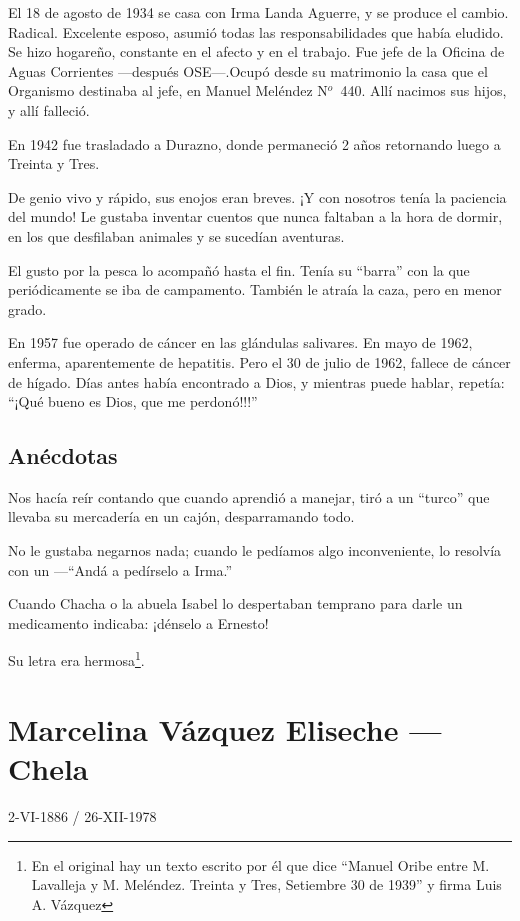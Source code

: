 \documentclass[a4paper]{article}
\begin{document}
El 18 de agosto de 1934 se casa con Irma Landa Aguerre, y se produce el cambio. Radical. Excelente esposo, asumió todas las responsabilidades que había eludido. Se hizo hogareño, constante en el afecto y en el trabajo. Fue jefe de la Oficina de Aguas Corrientes ---después OSE---.\@ Ocupó desde su matrimonio la casa que el Organismo destinaba al jefe, en Manuel Meléndez N$^o$~440. Allí nacimos sus hijos, y allí falleció.

En 1942 fue trasladado a Durazno, donde permaneció 2 años retornando luego a Treinta y Tres.

De genio vivo y rápido, sus enojos eran breves. ¡Y con nosotros tenía la paciencia del mundo! Le gustaba inventar cuentos que nunca faltaban a la hora de dormir, en los que desfilaban animales y se sucedían aventuras.

El gusto por la pesca lo acompañó hasta el fin. Tenía su ``barra'' con la que periódicamente se iba de campamento. También le atraía la caza, pero en menor grado.

En 1957 fue operado de cáncer en las glándulas salivares. En mayo de 1962, enferma, aparentemente de hepatitis. Pero el 30 de julio de 1962, fallece de cáncer de hígado. Días antes había encontrado a Dios, y mientras puede hablar, repetía: ``¡Qué bueno es Dios, que me perdonó!!!''

\subsection{Anécdotas}

Nos hacía reír contando que cuando aprendió a manejar, tiró a un ``turco'' que llevaba su mercadería en un cajón, desparramando todo.

No le gustaba negarnos nada; cuando le pedíamos algo inconveniente, lo resolvía con un ---``Andá a pedírselo a Irma.''

Cuando Chacha o la abuela Isabel lo despertaban temprano para darle un medicamento indicaba: ¡dénselo a Ernesto!

Su letra era hermosa\footnote{En el original hay un texto escrito por él que dice ``Manuel Oribe entre M. Lavalleja y M. Meléndez. Treinta y Tres, Setiembre 30 de 1939'' y firma Luis A. Vázquez}.

\section{Marcelina Vázquez Eliseche --- Chela}

2-VI-1886 / 26-XII-1978
\end{document}
